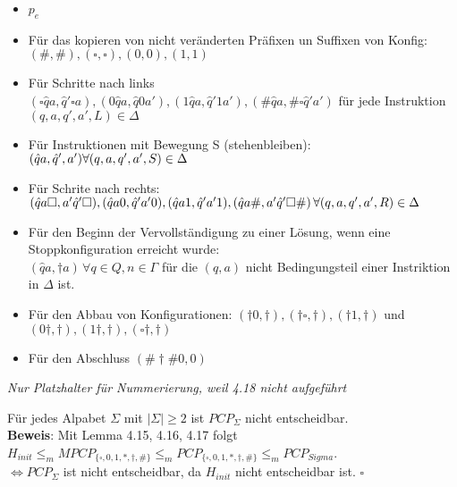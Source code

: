 \begin{lemma}{}
    
    \begin{itemize}
        \item $p_e$
        \item Für das kopieren von nicht veränderten Präfixen un Suffixen von Konfig: $(\#,\#),(\square,\square),(0,0),(1,1)$
        \item Für Schritte nach links $(\square \hat{q} a, \hat{q}' \square a), (0\hat{q} a, \hat{q} 0 a'), (1 \hat{q} a, \hat{q}' 1 a'), (\# \hat{q} a, \# \square \hat{q}'a')$
              für jede Instruktion $(q,a,q',a',L) \in \Delta$
        \item Für Instruktionen mit Bewegung S (stehenbleiben): $(\hat{q} a, \hat{q}',a') \\ \forall (q,a,q',a',S) \in \Delta $
        \item Für Schrite nach rechts: $(\hat{q} a \square, a' \hat{q}' \square),(\hat{q} a 0, \hat{q}' a'0),(\hat{q} a 1, \hat{q}' a' 1), \\
        (\hat{q} a \#, a' \hat{q}' \square \#) \, \forall (q,a,q',a',R) \in \Delta$
        \item Für den Beginn der Vervollständigung zu einer Lösung, wenn eine Stoppkonfiguration erreicht wurde: \\
              $(\hat{q} a, \dagger a) \, \forall q \in Q, n \in \Gamma$ für die $(q,a)$ nicht Bedingungsteil einer Instriktion in $\Delta$ ist.
        \item Für den Abbau von Konfigurationen: $(\dagger 0, \dagger),(\dagger \square, \dagger),(\dagger1,\dagger)$ und $(0\dagger,\dagger),
              (1 \dagger,\dagger),(\square \dagger,\dagger)$
        \item Für den Abschluss $(\#\dagger\#0,0)$
    \end{itemize}

\end{lemma}

\begin{bem}
    \textit{Nur Platzhalter für Nummerierung, weil 4.18 nicht aufgeführt}
\end{bem}

\begin{satz}{}
    Für jedes Alpabet $\Sigma$ mit $\vert \Sigma \vert \geq 2$ ist $PCP_\Sigma$ nicht entscheidbar. \\
    \textbf{Beweis}: Mit Lemma 4.15, 4.16, 4.17 folgt $H_{init} \leq_m MPCP_{\{\square, 0,1,*,\dagger,\#\}} \leq_m PCP_{\{\square,0,1,*,\dagger,\#\}}
    \leq_m PCP_{Sigma}$.\\
    $\Leftrightarrow PCP_\Sigma$ ist nicht entscheidbar, da $H_{init}$ nicht entscheidbar ist. $\square$
\end{satz}